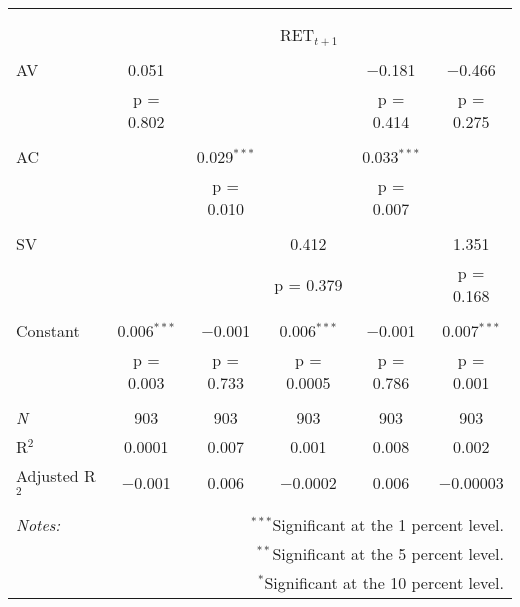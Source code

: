 
\begin{tabular}{@{\extracolsep{5pt}}lccccc} 
\\[-1.8ex]\hline 
\hline \\[-1.8ex] 
\\[-1.8ex] & \multicolumn{5}{c}{RET$_{t+1}$} \\ 
\hline \\[-1.8ex] 
 AV & 0.051 &  &  & $-$0.181 & $-$0.466 \\ 
  & p = 0.802 &  &  & p = 0.414 & p = 0.275 \\ 
  & & & & & \\ 
 AC &  & 0.029$^{***}$ &  & 0.033$^{***}$ &  \\ 
  &  & p = 0.010 &  & p = 0.007 &  \\ 
  & & & & & \\ 
 SV &  &  & 0.412 &  & 1.351 \\ 
  &  &  & p = 0.379 &  & p = 0.168 \\ 
  & & & & & \\ 
 Constant & 0.006$^{***}$ & $-$0.001 & 0.006$^{***}$ & $-$0.001 & 0.007$^{***}$ \\ 
  & p = 0.003 & p = 0.733 & p = 0.0005 & p = 0.786 & p = 0.001 \\ 
  & & & & & \\ 
\textit{N} & 903 & 903 & 903 & 903 & 903 \\ 
R$^{2}$ & 0.0001 & 0.007 & 0.001 & 0.008 & 0.002 \\ 
Adjusted R$^{2}$ & $-$0.001 & 0.006 & $-$0.0002 & 0.006 & $-$0.00003 \\ 
\hline 
\hline \\[-1.8ex] 
\textit{Notes:} & \multicolumn{5}{r}{$^{***}$Significant at the 1 percent level.} \\ 
 & \multicolumn{5}{r}{$^{**}$Significant at the 5 percent level.} \\ 
 & \multicolumn{5}{r}{$^{*}$Significant at the 10 percent level.} \\ 
\end{tabular} 
